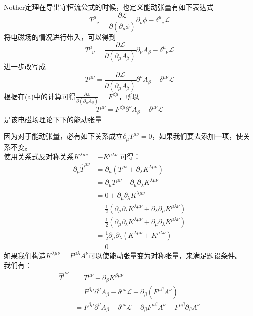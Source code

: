\documentclass{article}
\begin{document}
Nother定理在导出守恒流公式的时候，也定义能动张量有如下表达式
$$
T^{\mu}_{\phantom{\mu}\nu} = \frac{\partial \mathcal{L}}{\partial (\partial_{\mu}\phi)}  \partial_{\nu} \phi- \delta^{\mu}_{\phantom{\mu}\nu} \mathcal{L}
$$
将电磁场的情况进行带入，可以得到
$$
T^{\mu}_{\phantom{\mu}\nu} = \frac{\partial \mathcal{L}}{\partial (\partial_{\mu}A_{\beta})}  \partial_{\nu} A_{\beta}- \delta^{\mu}_{\phantom{\mu}\nu} \mathcal{L}
$$
进一步改写成
$$
T^{\mu \nu} = \frac{\partial \mathcal{L}}{\partial (\partial_{\mu}A_{\beta})}  \partial^{\nu} A_{\beta}- \delta^{\mu \nu} \mathcal{L}
$$
根据在(a)中的计算可得$\frac{\partial \mathcal{L}}{\partial (\partial_{\mu}A_{\beta})}  = F^{\beta \mu}$，所以$$T^{\mu \nu} = F^{\beta \mu} \partial^{\nu} A_{\beta}- \delta^{\mu \nu} \mathcal{L}$$
是该电磁场理论下下的能动张量

因为对于能动张量，必有如下关系成立$\partial_{\mu} T^{\mu \nu} =0 $，如果我们要去添加一项，使关系不变。\\
使用关系式反对称关系$K^{\lambda \mu \nu} = - K^{\mu \lambda \nu}$ 可得：
\begin{align}
\partial_{\mu} \hat{T}^{\mu \nu} &=\partial_{\mu} (T^{\mu \nu} + \partial_{\lambda} K^{\lambda \mu \nu}) \nonumber \\
				&=\partial_{\mu} T^{\mu \nu} + \partial_{\mu} \partial_{\lambda} K^{\lambda \mu \nu} \nonumber \\
				&= 0 + \partial_{\mu} \partial_{\lambda} K^{\lambda \mu \nu} \nonumber \\
				&= \frac{1}{2} (\partial_{\mu} \partial_{\lambda} K^{\lambda \mu \nu} + \partial_{\lambda} \partial_{\mu} K^{\mu \lambda \nu} ) \nonumber \\
				&= \frac{1}{2} (\partial_{\mu} \partial_{\lambda} K^{\lambda \mu \nu} + \partial_{\mu} \partial_{\lambda} K^{\mu \lambda \nu} ) \nonumber \\
				&=\frac{1}{2} \partial_{\mu} \partial_{\lambda} (K^{\lambda \mu \nu} + K^{\mu \lambda \nu}) \nonumber \\
				&=0 \nonumber
\end{align}
如果我们构造$K^{\lambda \mu \nu} = F^{\mu \lambda} A^{\nu}$可以使能动张量变为对称张量，来满足题设条件。\\
我们有：
\begin{align}
\hat{T}^{\mu \nu} &= T^{\mu \nu} + \partial_{\beta} K^{\beta \mu \nu} \nonumber \\
				&= F^{\beta \mu} \partial^{\nu} A_{\beta}- \delta^{\mu \nu} \mathcal{L} + \partial_{\beta}( F^{\mu \beta} A^{\nu})\nonumber \\
				&= F^{\beta \mu} \partial^{\nu} A_{\beta}- \delta^{\mu \nu} \mathcal{L} + \partial_{\beta} F^{\mu \beta} A^{\nu} + F^{\mu \beta} \partial_{\beta}A^{\nu} \nonumber 
\end{align}
\end{document}
